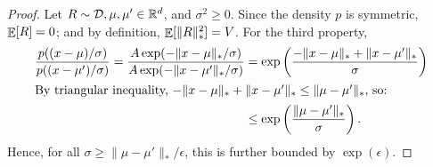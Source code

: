 \begin{proof}
Let $R\sim {\cal D}, \mu,\mu'\in \mathbb R^d$, and $\sigma^2\geq 0$. Since the density $p$ is symmetric, $\mathop{\mathbb{E}}[R]=0$; and by definition, $\mathop{\mathbb{E}}[\|R\|_*^2]=V$. For the third property,
\begin{align*}
    \frac{p((x-\mu)/\sigma)}{p((x-\mu')/\sigma)} 
    = \frac{A\exp(-\|x-\mu\|_*/\sigma)}{A\exp(-\|x-\mu'\|_*/\sigma)}
    &= \exp\left( \frac{-\|x-\mu\|_*+\|x-\mu'\|_*}{\sigma} \right) \\
    \intertext{By triangular inequality, $-\|x-\mu\|_*+\|x-\mu'\|_*\leq \|\mu-\mu'\|_*$, so:}
    &\leq \exp\left(\frac{\|\mu-\mu'\|_*}{\sigma}\right).
\end{align*}
Hence, for all $\sigma \geq \|\mu-\mu'\|_*/\epsilon$, this is further bounded by $\exp(\epsilon)$.
\end{proof}

